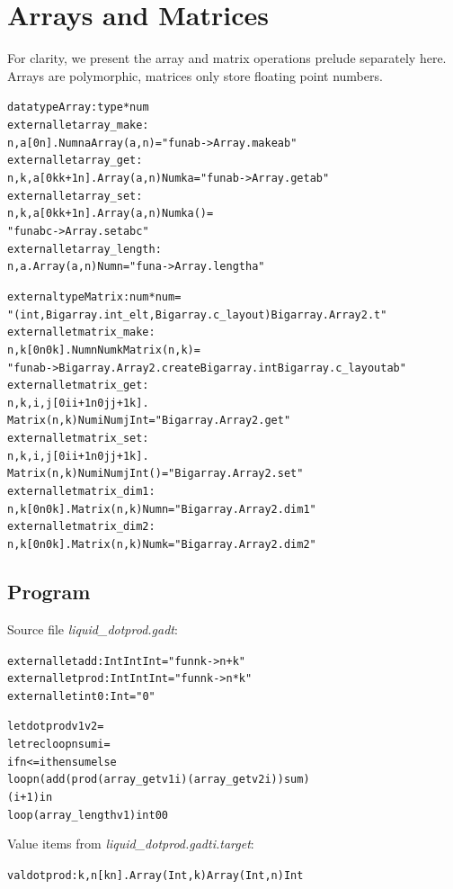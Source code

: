 \documentclass{article}
\newcommand{\tmem}[1]{{\em #1\/}}
\newcommand{\tmverbatim}[1]{{\ttfamily{#1}}}
\newenvironment{tmcode}[1][]{\begin{alltt}}{\end{alltt}}
\begin{document}
\section{Arrays and Matrices}

For clarity, we present the array and matrix operations prelude separately
here. Arrays are polymorphic, matrices only store floating point numbers.
\begin{tmcode}
datatype Array : type * num
external let array_make :
  n, a [0n]. Num n  a  Array (a, n) = "fun a b -> Array.make a b"
external let array_get :
  n, k, a [0k  k+1n]. Array (a, n)  Num k  a = "fun a b -> Array.get a b"
external let array_set :
  n, k, a [0k  k+1n]. Array (a, n)  Num k  a  () =
  "fun a b c -> Array.set a b c"
external let array_length :
  n, a. Array (a, n)  Num n = "fun a -> Array.length a"

external type Matrix : num * num =
  "(int, Bigarray.int_elt, Bigarray.c_layout) Bigarray.Array2.t"
external let matrix_make :
  n, k [0n  0k]. Num n  Num k  Matrix (n, k) =
  "fun a b -> Bigarray.Array2.create Bigarray.int Bigarray.c_layout a b"
external let matrix_get :
  n, k, i, j [0i  i+1n  0j  j+1k].
   Matrix (n, k)  Num i  Num j  Int = "Bigarray.Array2.get"
external let matrix_set :
  n, k, i, j [0i  i+1n  0j  j+1k].
   Matrix (n, k)  Num i  Num j  Int  () = "Bigarray.Array2.set"
external let matrix_dim1 :
  n, k [0n  0k]. Matrix (n, k)  Num n = "Bigarray.Array2.dim1"
external let matrix_dim2 :
  n, k [0n  0k]. Matrix (n, k)  Num k = "Bigarray.Array2.dim2"
\end{tmcode}

\subsection{Program \tmverbatim{dotprod}}

Source file {\tmem{liquid\_dotprod.gadt}}:
\begin{tmcode}
external let add : Int  Int  Int = "fun n k -> n + k"
external let prod : Int  Int  Int = "fun n k -> n * k"
external let int0 : Int = "0"

let dotprod v1 v2 =
  let rec loop n sum i =
    if n <= i then sum else
        loop n (add (prod (array_get v1 i) (array_get v2 i)) sum)
          (i + 1) in
  loop (array_length v1) int0 0
\end{tmcode}
Value items from {\tmem{liquid\_dotprod.gadti.target}}:
\begin{tmcode}
val dotprod : k, n[k  n]. Array (Int, k)  Array (Int, n)  Int
\end{tmcode}
\end{document}

